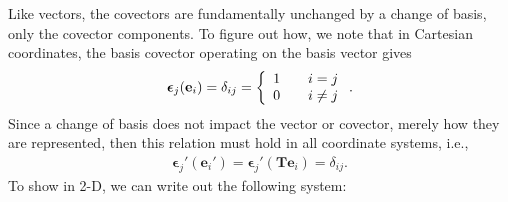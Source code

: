 Like vectors, the covectors are fundamentally unchanged by a change of basis, only the covector components. To figure out how, we note that in Cartesian coordinates, the basis covector operating on the basis vector gives
\begin{align}
  \boldsymbol\epsilon_j( \mathbf{e}_i ) = \delta_{ij} = \left\{ \begin{array}{c l} 1 & \quad i = j \\ 0 & \quad i \ne j \\ \end{array} \right. .
\end{align}
Since a change of basis does not impact the vector or covector, merely how they are represented, then this relation must hold in all coordinate systems, i.e., 
\begin{align}
  \boldsymbol\epsilon_j'( \mathbf{e}_i' ) = \boldsymbol\epsilon_j'( \mathbf{T} \mathbf{e}_i ) = \delta_{ij}. 
\end{align}  
To show in 2-D, we can write out the following system:

